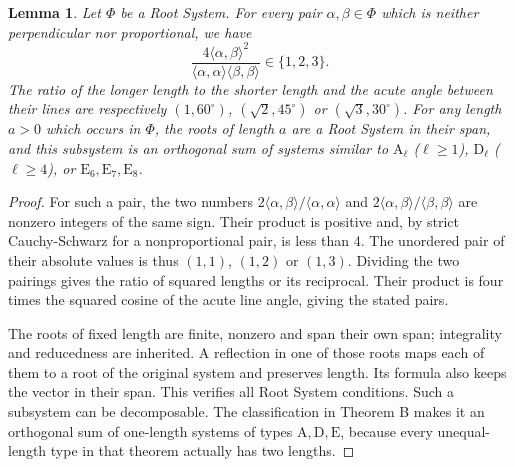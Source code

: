 \documentclass[11pt]{amsart}
\newcommand\ip[2]{\langle#1,#2\rangle}
\newtheorem{lemma}[theorem]{Lemma}
\theoremstyle{definition}
\newcommand{\typ}[1]{\mathrm{#1}}
\newcommand{\lsq}[1]{\ip{#1}{#1}}
\begin{document}
\begin{lemma}\label{lem:angles}
Let $\Phi$ be a Root System. For every pair $\alpha,\beta\in\Phi$
which is neither perpendicular nor proportional, we have
\[
 \frac{4\ip{\alpha}{\beta}^2}{\lsq{\alpha}\lsq{\beta}}\in\{1,2,3\}.
\]
The ratio of the longer length to the shorter length and the acute angle
between their lines are respectively
$(1,60^\circ)$, $(\sqrt2,45^\circ)$ or $(\sqrt3,30^\circ)$.
For any length $a>0$ which occurs in $\Phi$, the roots of length $a$
are a Root System in their span, and this subsystem is an orthogonal sum
of systems similar to $\typ A_\ell$ ($\ell\geq1$), $\typ D_\ell$
($\ell\geq4$), or $\typ E_6,\typ E_7,\typ E_8$.
\end{lemma}
\begin{proof}
For such a pair, the two numbers $2\ip{\alpha}{\beta}/\lsq{\alpha}$ and
$2\ip{\alpha}{\beta}/\lsq{\beta}$ are nonzero integers of the same
sign. Their product is positive and, by strict Cauchy-Schwarz for a
nonproportional pair, is less than 4. The unordered pair of their absolute
values is thus $(1,1)$, $(1,2)$ or $(1,3)$. Dividing the two
pairings gives the ratio of squared lengths or its reciprocal. Their
product is four times the squared cosine of the acute line angle, giving
the stated pairs.

The roots of fixed length are finite, nonzero and span their own span;
integrality and reducedness are inherited. A reflection in one of those
roots maps each of them to a root of the original system and preserves
length. Its formula also keeps the vector in their span. This verifies
all Root System conditions. Such a subsystem can be decomposable. The
classification in Theorem B makes it an orthogonal sum of one-length
systems of types $\typ A,\typ D,\typ E$, because every unequal-length
type in that theorem actually has two lengths.
\end{proof}
\end{document}
